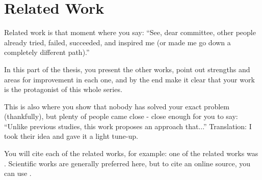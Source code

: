 \chapter{Related Work}
\label{chap:trabalhosrelacionados}

Related work is that moment where you say: \enquote{See, dear committee, other people already tried, failed, succeeded, and inspired me (or made me go down a completely different path).}

In this part of the thesis, you present the other works, point out strengths and areas for improvement in each one, and by the end make it clear that your work is the protagonist of this whole series.

This is also where you show that nobody has solved your exact problem (thankfully), but plenty of people came close - close enough for you to say: \enquote{Unlike previous studies, this work proposes an approach that...} Translation: I took their idea and gave it a light tune-up.

You will cite each of the related works, for example: one of the related works was \cite{akhtar2018threat}. Scientific works are generally preferred here, but to cite an online source, you can use .


